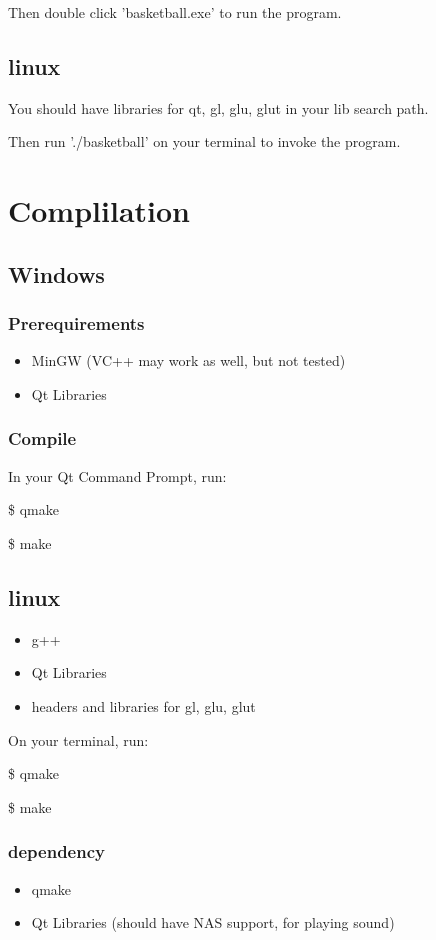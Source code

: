 \documentclass[10pt,a4paper]{article}
\begin{document}
Then double click 'basketball.exe' to run the program.

\subsection{linux}
You should have libraries for qt, gl, glu, glut in your lib search path.

Then run './basketball' on your terminal to invoke the program.

\section{Complilation}
\subsection{Windows}
\subsubsection{Prerequirements}
\begin{itemize}
\item MinGW (VC++ may work as well, but not tested)
\item Qt Libraries
\end{itemize}
\subsubsection{Compile}
In your Qt Command Prompt, run:

\$ qmake

\$ make

\subsection{linux}
\begin{itemize}
\item g++
\item Qt Libraries
\item headers and libraries for gl, glu, glut
\end{itemize}
On your terminal, run:

\$ qmake

\$ make
\subsubsection{dependency}
\begin{itemize}
\item qmake
\item Qt Libraries (should have NAS support, for playing sound)
\end{itemize}
\end{document}
